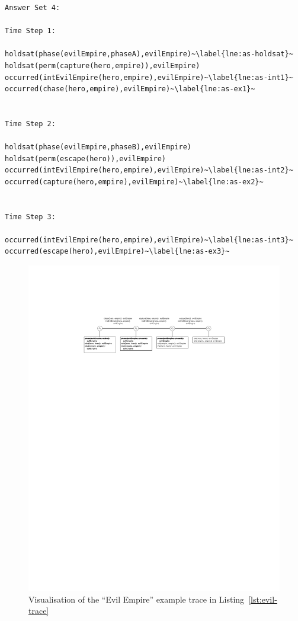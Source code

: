 \documentclass[11pt]{report}
\begin{document}
\begin{lstlisting}[label={lst:evil-trace}, caption={Example trace for the ``Evil
Empire'' trope}, escapechar=\~]
Answer Set 4:

Time Step 1:

holdsat(phase(evilEmpire,phaseA),evilEmpire)~\label{lne:as-holdsat}~
holdsat(perm(capture(hero,empire)),evilEmpire)
occurred(intEvilEmpire(hero,empire),evilEmpire)~\label{lne:as-int1}~
occurred(chase(hero,empire),evilEmpire)~\label{lne:as-ex1}~


Time Step 2:

holdsat(phase(evilEmpire,phaseB),evilEmpire)
holdsat(perm(escape(hero)),evilEmpire)
occurred(intEvilEmpire(hero,empire),evilEmpire)~\label{lne:as-int2}~
occurred(capture(hero,empire),evilEmpire)~\label{lne:as-ex2}~


Time Step 3:

occurred(intEvilEmpire(hero,empire),evilEmpire)~\label{lne:as-int3}~
occurred(escape(hero),evilEmpire)~\label{lne:as-ex3}~
\end{lstlisting}

\begin{figure}[!t]
\centerline{\includegraphics[width=\textwidth]{evilEmpire4-crop.pdf}}
\caption{Visualisation of the ``Evil Empire'' example trace in Listing~\ref{lst:evil-trace}}\label{fig:evil-trace}
\end{figure}
\end{document}
